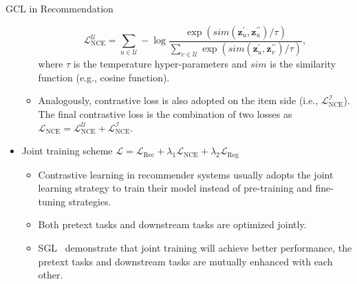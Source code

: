 \documentclass[t]{beamer}
\begin{document}
\begin{frame}[allowframebreaks]{GCL in Recommendation}
\begin{itemize}
\begin{itemize}
\begin{equation*}
\label{eq:info_nce}
\mathcal{L}^{\mathcal{U}}_{\text{NCE}}=\sum_{u \in \mathcal{U}}-\log \frac{\exp \left(sim\left(\mathbf{z}_{u}^{\prime}, \mathbf{z}_{u}^{\prime \prime}\right) / \tau\right)}{\sum_{v \in \mathcal{U}} \exp \left(sim\left(\mathbf{z}_{u}^{\prime}, \mathbf{z}_{v}^{\prime \prime}\right) / \tau\right)}, 
\end{equation*}
where $\tau$ is the temperature hyper-parameters and $sim$ is the similarity function (e.g., cosine function).
            
            \item Analogously, contrastive loss is also adopted on the item side (i.e., $\mathcal{L}^{\mathcal{I}}_{\text{NCE}}$).
The final contrastive loss is the combination of two losses as $\mathcal{L}_{\text{NCE}} = \mathcal{L}^{\mathcal{U}}_{\text{NCE}} + \mathcal{L}^{\mathcal{I}}_{\text{NCE}} $.
        \end{itemize}
\framebreak
    
    \item Joint training scheme $\mathcal{L} = \mathcal{L}_{\text{Rec}} + \lambda_1 \mathcal{L}_{\text{NCE}} + \lambda_2 \mathcal{L}_{\text{Reg}}$
    \begin{itemize}
        \item Contrastive learning in recommender systems usually adopts the joint learning strategy to train their model instead of pre-training and fine-tuning strategies.
        \item Both pretext tasks and downstream tasks are optimized jointly.
        \item  SGL~ demonstrate that joint training will achieve better performance, the pretext tasks and downstream tasks are mutually enhanced with each other.
    \end{itemize}
    
           
       

           

\end{itemize}

\end{frame}
\end{document}
